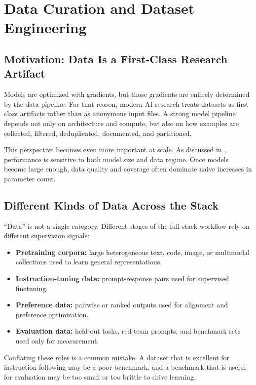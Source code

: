 \documentclass[class=article,crop=false]{standalone}
\begin{document}
\section{Data Curation and Dataset Engineering}
\label{sec:data}

\subsection{Motivation: Data Is a First-Class Research Artifact}
\label{sec:data:motivation}

Models are optimized with gradients, but those gradients are entirely determined by the data pipeline. For that reason, modern AI research treats datasets as first-class artifacts rather than as anonymous input files. A strong model pipeline depends not only on architecture and compute, but also on how examples are collected, filtered, deduplicated, documented, and partitioned.

This perspective becomes even more important at scale. As discussed in , performance is sensitive to both model size and data regime. Once models become large enough, data quality and coverage often dominate naive increases in parameter count.

\subsection{Different Kinds of Data Across the Stack}
\label{sec:data:kinds}

``Data'' is not a single category. Different stages of the full-stack workflow rely on different supervision signals:
\begin{itemize}
  \item \textbf{Pretraining corpora:} large heterogeneous text, code, image, or multimodal collections used to learn general representations.
  \item \textbf{Instruction-tuning data:} prompt-response pairs used for supervised finetuning.
  \item \textbf{Preference data:} pairwise or ranked outputs used for alignment and preference optimization.
  \item \textbf{Evaluation data:} held-out tasks, red-team prompts, and benchmark sets used only for measurement.
\end{itemize}

Conflating these roles is a common mistake. A dataset that is excellent for instruction following may be a poor benchmark, and a benchmark that is useful for evaluation may be too small or too brittle to drive learning.
\end{document}
